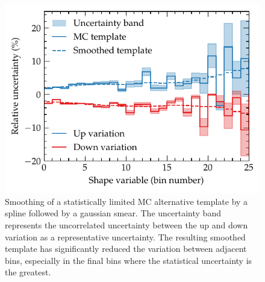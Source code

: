 \begin{figure}
    \centering
    \includegraphics{appendices/100_appendices/images/smoothing_example.pdf}
    \caption[Example of MC alternative template smoothing.]{
        Smoothing of a statistically limited MC alternative template by a spline followed by a gaussian smear. The uncertainty band represents the uncorrelated uncertainty between the up and down variation as a representative uncertainty. The resulting smoothed template has significantly reduced the variation between adjacent bins, especially in the final bins where the statistical uncertainty is the greatest.
    }
    \label{fig:smoothing_example}
\end{figure}


